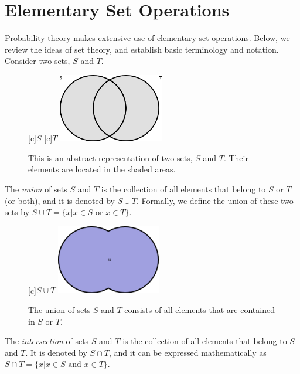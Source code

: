 \section{Elementary Set Operations}

Probability theory makes extensive use of elementary set operations.
Below, we review the ideas of set theory, and establish basic terminology and notation.
Consider two sets, $S$ and $T$.

\begin{figure}[htb!]
\begin{center}
\begin{psfrags}
[c]{$S$}
[c]{$T$}
\includegraphics[height=3.00cm]{Figures/1Chapter/sets}
\end{psfrags}
\caption{This is an abstract representation of two sets, $S$ and $T$.
Their elements are located in the shaded areas.}
\end{center}
\end{figure}

The \emph{union} of sets $S$ and $T$ is the collection of all elements that belong to $S$ or $T$ (or both), and it is denoted by $S \cup T$.
Formally, we define the union of these two sets by $S \cup T = \{ x | x \in S \text{ or } x \in T \}$.

\begin{figure}[htb!]
\begin{center}
\begin{psfrags}
[c]{$S \cup T$}
\includegraphics[height=3.03cm]{Figures/1Chapter/union}
\end{psfrags}
\caption{The union of sets $S$ and $T$ consists of all elements that are contained in $S$ or $T$.}
\end{center}
\end{figure}

The \emph{intersection} of sets $S$ and $T$ is the collection of all elements that belong to $S$ and $T$.
It is denoted by $S \cap T$, and it can be expressed mathematically as $S \cap T = \{ x | x \in S \text{ and } x \in T \}$.

